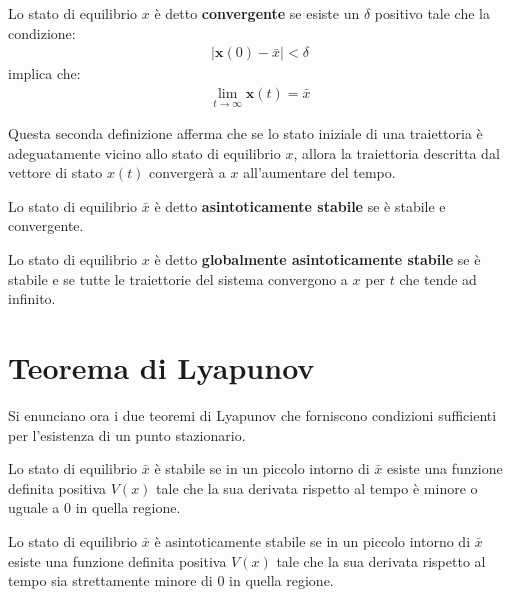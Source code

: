 \begin{mydef}
    Lo stato di equilibrio $x$ è detto \textbf{convergente} se esiste un $\delta$ positivo tale che la
    condizione:
    \begin{align*}
        \left|\mathbf{x}(0) - \bar{x} \right| < \delta
    \end{align*}
    implica che:
    \begin{align*}
        \lim_{t \rightarrow \infty} \mathbf{x}(t) = \bar{x}
    \end{align*}
\end{mydef}
Questa seconda definizione afferma che se lo stato iniziale di una traiettoria è adeguatamente vicino allo stato di equilibrio $x$, allora la traiettoria descritta dal vettore di stato $x(t)$ convergerà a $x$ all'aumentare del tempo.
\begin{mydef}
    Lo stato di equilibrio $\bar{x}$ è detto \textbf{asintoticamente stabile} se è stabile e convergente.
\end{mydef}
\begin{mydef}
    Lo stato di equilibrio $x$ è detto \textbf{globalmente asintoticamente stabile} se è stabile e se
    tutte le traiettorie del sistema convergono a $x$ per $t$ che tende ad infinito.
\end{mydef}

\newpage


\section{Teorema di Lyapunov} %
\label{sub:teorema_di_lyapunov}
Si enunciano ora i due teoremi di Lyapunov che forniscono condizioni sufficienti per l'esistenza di un punto stazionario.

\begin{thm}
    Lo stato di equilibrio $\bar{x}$ è stabile se in un piccolo intorno di $\bar{x}$ esiste una funzione definita positiva $V(x)$ tale che la sua derivata rispetto al tempo è minore o uguale a 0 in quella regione.
\end{thm}

\begin{thm}
     Lo stato di equilibrio $\bar{x}$ è asintoticamente stabile se in un piccolo intorno di $\bar{x}$ esiste una funzione definita positiva $V(x)$ tale che la sua derivata rispetto al tempo sia strettamente minore di 0 in quella regione.
\end{thm}

